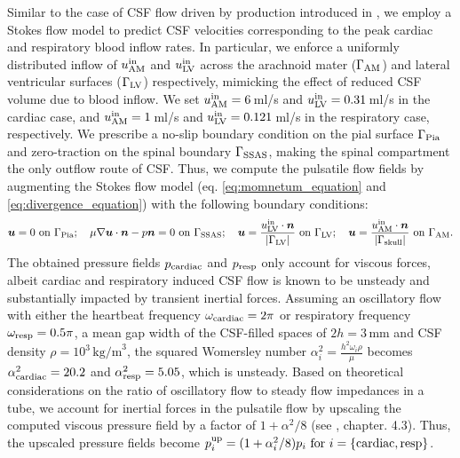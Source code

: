 Similar to the case of CSF flow driven by production introduced in , we employ a Stokes flow model to predict CSF velocities corresponding to the peak cardiac and respiratory blood inflow rates. In particular, we enforce a uniformly distributed inflow of $u^{\rm in}_{\rm AM}$ and $u^{\rm in}_{\rm LV}$ across the arachnoid mater ($\Gamma_{\rm AM}$) and lateral ventricular surfaces ($\Gamma_{\rm LV}$) respectively, mimicking the effect of reduced CSF volume due to blood inflow. We set $u^{\rm in}_{\rm AM} = 6\,$ml/s \cite{causemann2022human,baledent2014imaging} and $u^{\rm in}_{\rm LV}=0.31\,$ml/s \cite{vinje2019respiratory} in the cardiac case, and $u^{\rm{in}}_{\rm{AM}} = 1\,$ml/s \cite{gutierrez2022effect} and $u^{\rm in}_{\rm{LV}}=0.121\,$ml/s \cite{liu2024using} in the respiratory case, respectively.
We prescribe a no-slip boundary condition on the pial surface $\Gamma_{\rm Pia}$ and zero-traction on the spinal boundary $\Gamma_{\rm SSAS}$, making the spinal compartment the only outflow route of CSF. Thus, we compute the pulsatile flow fields by augmenting the Stokes flow model (eq. \ref{eq:momnetum_equation} and \ref{eq:divergence_equation}) with the following boundary conditions:
\begin{equation}\label{eq:cardiac_flow_bcs}
    \bm u = 0 \text{ on } \Gamma_{\rm Pia}; \quad 
    \mu \nabla \bm u \cdot \bm n - p \bm n = 0 \text{ on } \Gamma_{\rm SSAS}; \quad 
    \bm u = \frac{u^{\rm in}_{\rm LV} \cdot \bm n}{|\Gamma_{\rm LV}|} \text{ on } \Gamma_{\rm LV}; \quad
    \bm u = \frac{u^{\rm in}_{\rm AM} \cdot \bm n}{|\Gamma_{\rm skull}|} \text{ on } \Gamma_{\rm AM}.
\end{equation}
The obtained pressure fields $p_{\rm cardiac}$ and $p_{\rm resp}$ only account for viscous forces, albeit cardiac and respiratory induced CSF flow is known to be unsteady and substantially impacted by transient inertial forces. Assuming an oscillatory flow with either the heartbeat frequency $\omega_{\rm cardiac} = 2 \pi$ or respiratory frequency $\omega_{\rm resp} = 0.5 \pi$, a mean gap width of the CSF-filled spaces of $2h=3$\,mm and CSF density $\rho=10^3\,\text{kg/m}^3$, the squared Womersley number $\alpha_i^2 = \frac{h^2 \omega_{i} \rho}{\mu}$ becomes $\alpha_{\rm cardiac}^2 = 20.2$ and $\alpha_{\rm resp}^2=5.05$, which is unsteady. Based on theoretical considerations on the ratio of oscillatory flow to steady flow impedances in a tube, we account for inertial forces in the pulsatile flow by upscaling the computed viscous pressure field by a factor of $1 + \alpha^2 / 8$ (see \cite{van1998cardiovascular}, chapter. 4.3). Thus, the upscaled pressure fields become $p^{\rm up}_{i}= (1 + \alpha_{i}^2 / 8)p_i \text{ for } i = \{\mathrm{cardiac}, \mathrm{resp}\}$.

